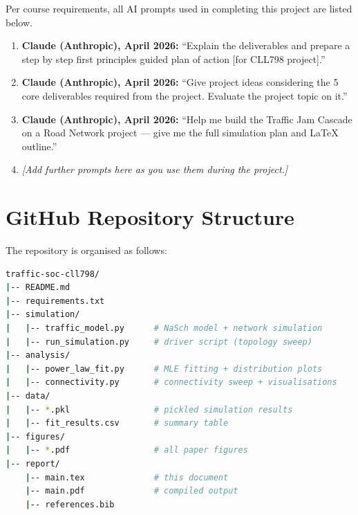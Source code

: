 \documentclass[12pt,a4paper]{article}
\begin{document}
Per course requirements, all AI prompts used in completing this 
project are listed below.

\begin{enumerate}
  \item \textbf{Claude (Anthropic), April 2026:}
        ``Explain the deliverables and prepare a step by step first 
        principles guided plan of action [for CLL798 project].''

  \item \textbf{Claude (Anthropic), April 2026:}
        ``Give project ideas considering the 5 core deliverables 
        required from the project. Evaluate the project topic on it.''

  \item \textbf{Claude (Anthropic), April 2026:}
        ``Help me build the Traffic Jam Cascade on a Road Network 
        project --- give me the full simulation plan and LaTeX outline.''

  \item \textit{[Add further prompts here as you use them during 
        the project.]}
\end{enumerate}

\section{GitHub Repository Structure}
\label{app:github}

The repository is organised as follows:

\begin{lstlisting}[language=bash, numbers=none]
traffic-soc-cll798/
|-- README.md
|-- requirements.txt
|-- simulation/
|   |-- traffic_model.py      # NaSch model + network simulation
|   |-- run_simulation.py     # driver script (topology sweep)
|-- analysis/
|   |-- power_law_fit.py      # MLE fitting + distribution plots
|   |-- connectivity.py       # connectivity sweep + visualisations
|-- data/
|   |-- *.pkl                 # pickled simulation results
|   |-- fit_results.csv       # summary table
|-- figures/
|   |-- *.pdf                 # all paper figures
|-- report/
    |-- main.tex              # this document
    |-- main.pdf              # compiled output
    |-- references.bib
\end{lstlisting}
\end{document}
